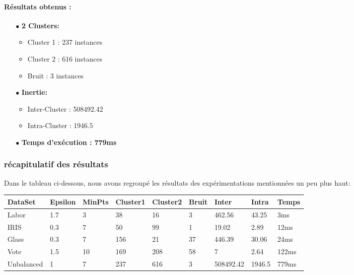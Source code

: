 \documentclass[12pt,a4paper,oneside]{book}
\begin{document}
\paragraph{Résultats obtenus :}
\begin{itemize}
	\item[$\bullet$] \textbf{2 Clusters: }
	\begin{itemize}
		\item Cluster 1 : 237 instances
		\item Cluster 2 : 616 instances
		\item Bruit : 3 instances
	\end{itemize}
	\item[$\bullet$] \textbf{Inertie:}
	\begin{itemize}
		\item Inter-Cluster : 508492.42
		\item Intra-Cluster : 1946.5
	\end{itemize}
	\item[$\bullet$] \textbf{Temps d'exécution : 779ms}
\end{itemize}


\subsubsection*{récapitulatif des résultats}
Dans le tableau ci-dessous, nous avons regroupé les résultats des expérimentations mentionnées un peu plus haut:
\begin{center}
	\begin{tabular}{|p{2cm}|p{1.2cm}|p{1.2cm}|p{1.5cm}|p{1.5cm}|p{1.5cm}|p{1.5cm}|p{1.5cm}|p{1.2cm}|}
		\hline
		\textbf{DataSet} & \textbf{Epsilon} & \textbf{MinPts} & \textbf{Cluster1} & \textbf{Cluster2} & \textbf{Bruit} & \textbf{Inter} & \textbf{Intra} & \textbf{Temps}
		\\
		\hline
		
		Labor & 1.7 & 3 & 38 & 16 & 3 & 462.56 & 43.25 & 3ms
		\\
		\hline
		
		IRIS & 0.3 & 7 & 50 & 99 & 1 & 19.02 & 2.89 & 12ms
		\\
		\hline
		
		
		Glass & 0.3 & 7 & 156 & 21 & 37 & 446.39 & 30.06 & 24ms
		\\
		\hline
		
		Vote & 1.5 & 10 & 169 & 208 & 58 & 7 & 2.64 & 122ms
		\\
		\hline
		
		
		Unbalanced & 1 & 7 & 237 & 616 & 3 & 508492.42 & 1946.5 & 779ms
		\\
		\hline
	\end{tabular} 
\end{center}
\end{document}

